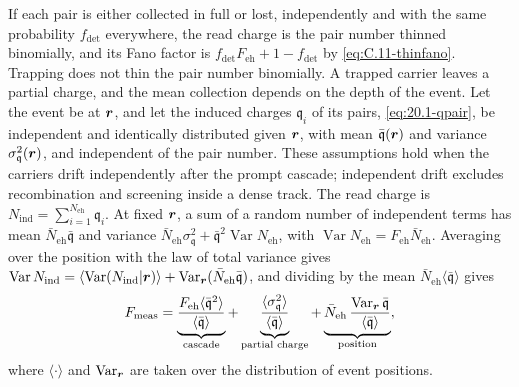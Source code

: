 If each pair is either collected in full or lost, independently and with the same probability $f_{\mathrm{det}}$ everywhere, the read charge is the pair number thinned binomially, and its Fano factor is $f_{\mathrm{det}}F_{\mathrm{eh}} + 1 - f_{\mathrm{det}}$ by \cref{eq:C.11-thinfano}. Trapping does not thin the pair number binomially. A trapped carrier leaves a partial charge, and the mean collection depends on the depth of the event. Let the event be at $\bm{r}$, and let the induced charges $\mathfrak{q}_i$ of its pairs, \cref{eq:20.1-qpair}, be independent and identically distributed given $\bm{r}$, with mean $\bar{\mathfrak{q}}(\bm{r})$ and variance $\sigma_{\mathfrak{q}}^2(\bm{r})$, and independent of the pair number. These assumptions hold when the carriers drift independently after the prompt cascade; independent drift excludes recombination and screening inside a dense track. The read charge is $N_{\mathrm{ind}} = \sum_{i=1}^{N_{\mathrm{eh}}}\mathfrak{q}_i$. At fixed $\bm{r}$, a sum of a random number of independent terms has mean $\bar N_{\mathrm{eh}}\bar{\mathfrak{q}}$ and variance $\bar N_{\mathrm{eh}}\sigma_{\mathfrak{q}}^2 + \bar{\mathfrak{q}}^2\operatorname{Var}N_{\mathrm{eh}}$, with $\operatorname{Var}N_{\mathrm{eh}} = F_{\mathrm{eh}}\bar N_{\mathrm{eh}}$. Averaging over the position with the law of total variance gives $\operatorname{Var}N_{\mathrm{ind}} = \langle\operatorname{Var}(N_{\mathrm{ind}}|\bm{r})\rangle + \operatorname{Var}_{\bm{r}}(\bar N_{\mathrm{eh}}\bar{\mathfrak{q}})$, and dividing by the mean $\bar N_{\mathrm{eh}}\langle\bar{\mathfrak{q}}\rangle$ gives
\begin{equation}
  F_{\mathrm{meas}} = \underbrace{\frac{F_{\mathrm{eh}}\langle\bar{\mathfrak{q}}^2\rangle}{\langle\bar{\mathfrak{q}}\rangle}}_{\text{cascade}} + \underbrace{\frac{\langle\sigma_{\mathfrak{q}}^2\rangle}{\langle\bar{\mathfrak{q}}\rangle}}_{\text{partial charge}} + \underbrace{\bar N_{\mathrm{eh}}\,\frac{\operatorname{Var}_{\bm{r}}\bar{\mathfrak{q}}}{\langle\bar{\mathfrak{q}}\rangle}}_{\text{position}} ,
  \label{eq:20.1-Fpos}
\end{equation}
where $\langle\cdot\rangle$ and $\operatorname{Var}_{\bm{r}}$ are taken over the distribution of event positions.

